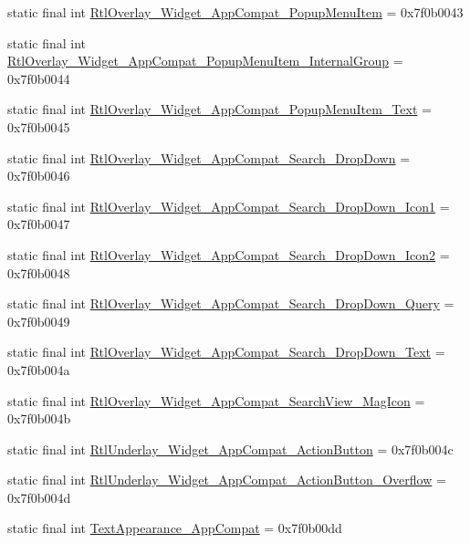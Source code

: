 \begin{CompactItemize}
\item 
static final int \hyperlink{classandroid_1_1support_1_1v4_1_1_r_1_1style_d979576933eb5147e0fdb7ef9f7e9a63}{RtlOverlay\_\-Widget\_\-AppCompat\_\-PopupMenuItem} = 0x7f0b0043
\item 
static final int \hyperlink{classandroid_1_1support_1_1v4_1_1_r_1_1style_68238bd5a767861271ce10e7e2554475}{RtlOverlay\_\-Widget\_\-AppCompat\_\-PopupMenuItem\_\-InternalGroup} = 0x7f0b0044
\item 
static final int \hyperlink{classandroid_1_1support_1_1v4_1_1_r_1_1style_642a58682102a3e62b26657cd7c49444}{RtlOverlay\_\-Widget\_\-AppCompat\_\-PopupMenuItem\_\-Text} = 0x7f0b0045
\item 
static final int \hyperlink{classandroid_1_1support_1_1v4_1_1_r_1_1style_44054a9e76dc7570e20cf74da567a5db}{RtlOverlay\_\-Widget\_\-AppCompat\_\-Search\_\-DropDown} = 0x7f0b0046
\item 
static final int \hyperlink{classandroid_1_1support_1_1v4_1_1_r_1_1style_2804514e3eba3f5bf57ac3b4e4dbeb33}{RtlOverlay\_\-Widget\_\-AppCompat\_\-Search\_\-DropDown\_\-Icon1} = 0x7f0b0047
\item 
static final int \hyperlink{classandroid_1_1support_1_1v4_1_1_r_1_1style_a5208ef066764d61aa2fa3d18b46499c}{RtlOverlay\_\-Widget\_\-AppCompat\_\-Search\_\-DropDown\_\-Icon2} = 0x7f0b0048
\item 
static final int \hyperlink{classandroid_1_1support_1_1v4_1_1_r_1_1style_0c6aa1925b1a462c1b01d3a5297544b6}{RtlOverlay\_\-Widget\_\-AppCompat\_\-Search\_\-DropDown\_\-Query} = 0x7f0b0049
\item 
static final int \hyperlink{classandroid_1_1support_1_1v4_1_1_r_1_1style_ac9579e794a8e5a44f03b649bb4ac94d}{RtlOverlay\_\-Widget\_\-AppCompat\_\-Search\_\-DropDown\_\-Text} = 0x7f0b004a
\item 
static final int \hyperlink{classandroid_1_1support_1_1v4_1_1_r_1_1style_9a9882fba7e4d007fb67e9fd1be6e885}{RtlOverlay\_\-Widget\_\-AppCompat\_\-SearchView\_\-MagIcon} = 0x7f0b004b
\item 
static final int \hyperlink{classandroid_1_1support_1_1v4_1_1_r_1_1style_dec2e84949d9cbd4738d5c5c6ee7e730}{RtlUnderlay\_\-Widget\_\-AppCompat\_\-ActionButton} = 0x7f0b004c
\item 
static final int \hyperlink{classandroid_1_1support_1_1v4_1_1_r_1_1style_e411bc3ffce96f5438714d101314bb2d}{RtlUnderlay\_\-Widget\_\-AppCompat\_\-ActionButton\_\-Overflow} = 0x7f0b004d
\item 
static final int \hyperlink{classandroid_1_1support_1_1v4_1_1_r_1_1style_ef6ea1b075e731ecf32248b993cd4842}{TextAppearance\_\-AppCompat} = 0x7f0b00dd

\end{CompactItemize}
